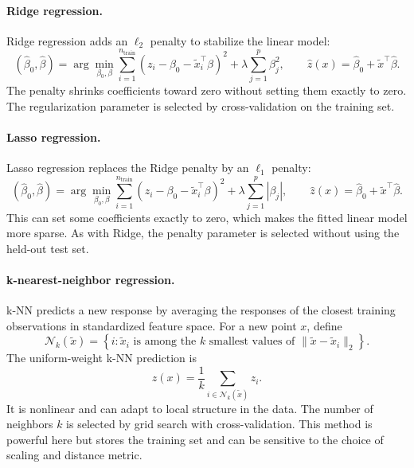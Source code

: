 \documentclass[11pt,a4paper]{article}
\begin{document}
\paragraph{Ridge regression.}
Ridge regression adds an \(\ell_2\) penalty to stabilize the linear model:
\[
(\widehat\beta_0,\widehat\beta)
=\arg\min_{\beta_0,\beta}
\sum_{i=1}^{n_{\mathrm{train}}}
\left(z_i-\beta_0-\widetilde x_i^\top\beta\right)^2+
\lambda\sum_{j=1}^{p}\beta_j^2,
\qquad
\widehat z(x)=\widehat\beta_0+\widetilde x^\top\widehat\beta .
\]
The penalty shrinks coefficients toward zero without setting them exactly to zero.
The regularization parameter is selected by cross-validation on the training set.

\paragraph{Lasso regression.}
Lasso regression replaces the Ridge penalty by an \(\ell_1\) penalty:
\[
(\widehat\beta_0,\widehat\beta)
=\arg\min_{\beta_0,\beta}
\sum_{i=1}^{n_{\mathrm{train}}}
\left(z_i-\beta_0-\widetilde x_i^\top\beta\right)^2+
\lambda\sum_{j=1}^{p}|\beta_j|,
\qquad
\widehat z(x)=\widehat\beta_0+\widetilde x^\top\widehat\beta .
\]
This can set some coefficients exactly to zero, which makes the fitted linear
model more sparse. As with Ridge, the penalty parameter is selected without using
the held-out test set.

\paragraph{k-nearest-neighbor regression.}
k-NN predicts a new response by averaging the responses of the closest training
observations in standardized feature space. For a new point \(x\), define
\[
\mathcal N_k(\widetilde x)=
\left\{i:\widetilde x_i \text{ is among the } k \text{ smallest values of }
\|\widetilde x-\widetilde x_i\|_2\right\}.
\]
The uniform-weight k-NN prediction is
\[
\widehat z(x)=\frac{1}{k}\sum_{i\in\mathcal N_k(\widetilde x)} z_i .
\]
It is nonlinear and can adapt to local structure in the data. The number of
neighbors \(k\) is selected by grid search with cross-validation. This method is
powerful here but stores the training set and can be sensitive to the choice of
scaling and distance metric.
\end{document}
